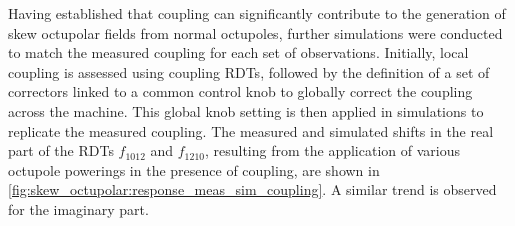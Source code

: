 

Having established that coupling can significantly contribute to the generation of skew octupolar
fields from normal octupoles, further simulations were conducted to match the measured coupling for
each set of observations. Initially, local coupling is assessed using coupling RDTs, followed by the
definition of a set of correctors linked to a common control knob to globally correct the coupling
across the machine. This global knob setting is then applied in simulations to replicate the
measured coupling.
The measured and simulated shifts in the real part of the RDTs $f_{1012}$ and $f_{1210}$, resulting
from the application of various octupole powerings in the presence of coupling, are shown in
\cref{fig:skew_octupolar:response_meas_sim_coupling}. A similar trend is observed for the imaginary
part.

